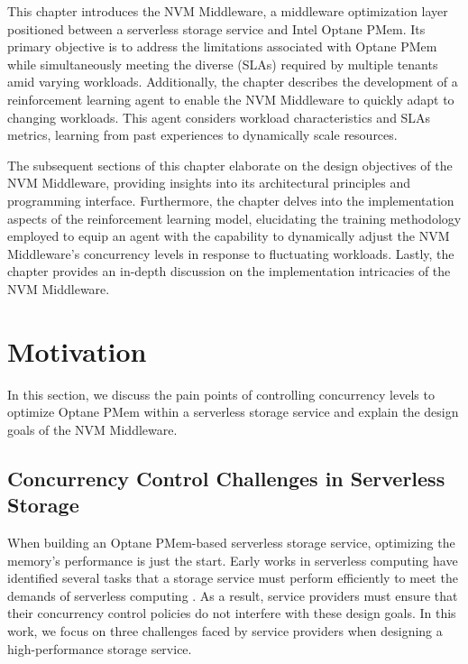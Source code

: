 This chapter introduces the NVM Middleware, a middleware optimization layer positioned between a serverless storage service and Intel Optane PMem. Its primary objective is to address the limitations associated with Optane PMem while simultaneously meeting the diverse (SLAs) required by multiple tenants amid varying workloads. Additionally, the chapter describes the development of a reinforcement learning agent to enable the NVM Middleware to quickly adapt to changing workloads. This agent considers workload characteristics and SLAs metrics, learning from past experiences to dynamically scale resources.

The subsequent sections of this chapter elaborate on the design objectives of the NVM Middleware, providing insights into its architectural principles and programming interface. Furthermore, the chapter delves into the implementation aspects of the reinforcement learning model, elucidating the training methodology employed to equip an agent with the capability to dynamically adjust the NVM Middleware's concurrency levels in response to fluctuating workloads. Lastly, the chapter provides an in-depth discussion on the implementation intricacies of the NVM Middleware.

\section{Motivation}

In this section, we discuss the pain points of controlling concurrency levels to optimize Optane PMem within a serverless storage service and explain the design goals of the NVM Middleware.

\subsection{Concurrency Control Challenges in Serverless Storage}

When building an Optane PMem-based serverless storage service, optimizing the memory's performance is just the start. Early works in serverless computing have identified several tasks that a storage service must perform efficiently to meet the demands of serverless computing \cite{180275,jonas2019cloud,klimovic2018understanding,klimovic2018pocket,wu2019autoscaling,romero2021faat}. As a result, service providers must ensure that their concurrency control policies do not interfere with these design goals. In this work, we focus on three challenges faced by service providers when designing a high-performance storage service.

